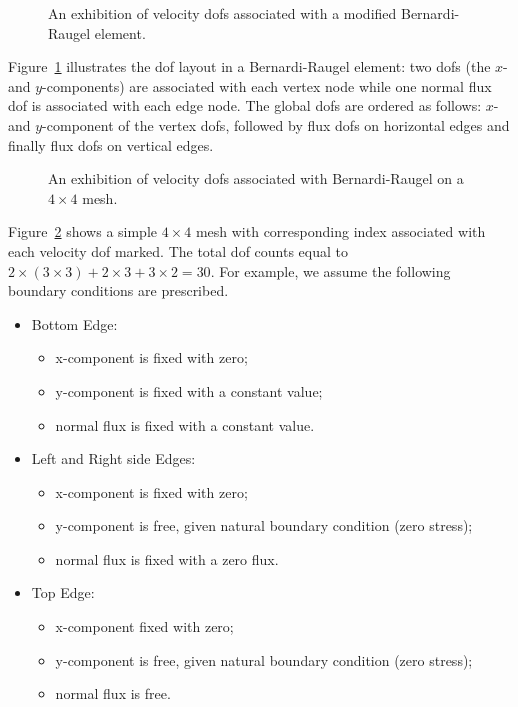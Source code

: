 \begin{figure}[htb]
\centering

		  \caption{An exhibition of velocity dofs associated with a modified Bernardi-Raugel element.}
\label{fig:brelem}
\end{figure}
Figure~\ref{fig:brelem} illustrates the dof layout in a Bernardi-Raugel
element: two dofs (the $x$-and $y$-components) are associated with each vertex node
while one normal flux dof is associated with each edge node. 
The global dofs are ordered as follows: $x$-and $y$-component of the vertex dofs, followed
by flux dofs on horizontal edges and finally flux dofs on vertical edges.

\begin{figure}[htb]
\centering

		  \caption{An exhibition of velocity dofs associated with Bernardi-Raugel  on a $4 \times 4$ mesh.}
\label{fig:44mesh}
\end{figure}

Figure~\ref{fig:44mesh} shows a simple $4\times 4$ mesh with corresponding
index associated with each velocity dof marked.
The total dof counts equal to $2\times(3\times3) + 2\times 3 + 3 \times 2 = 30$.
For example,
we assume the following boundary conditions are prescribed.
\begin{itemize}
		  \item Bottom Edge:
					 \begin{itemize}
								\item x-component is fixed with zero;
								\item y-component is fixed with a constant value;
							   \item normal flux is fixed with a constant value.
					 \end{itemize}
		  \item Left and Right side Edges:
					 \begin{itemize}
								\item x-component is fixed with zero;
								\item y-component is free, given natural boundary condition (zero stress);
							   \item normal flux is fixed with a zero flux.
					 \end{itemize}
		  \item Top Edge:
					 \begin{itemize}
								\item x-component fixed with zero;
								\item y-component is free, given natural boundary condition (zero stress);
							   \item normal flux is free.
					 \end{itemize}
\end{itemize}

